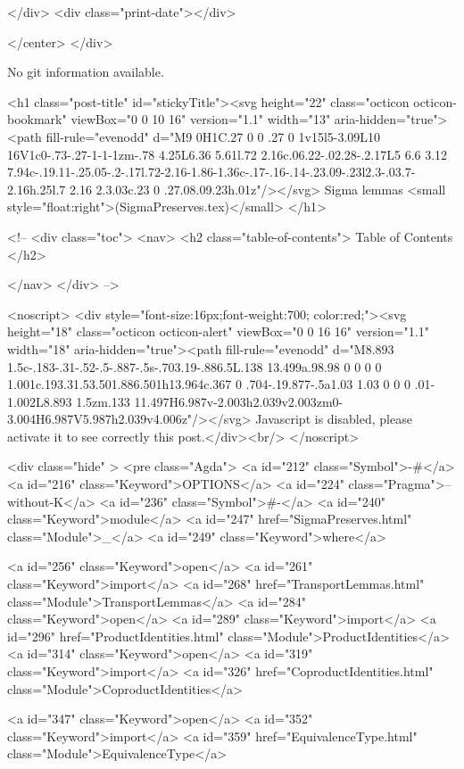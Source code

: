           
        </div>
        <div class="print-date"></div>
        
        
    </center>
  </div>

  
  No git information available.
  

  <h1 class="post-title" id="stickyTitle"><svg height="22" class="octicon octicon-bookmark" viewBox="0 0 10 16" version="1.1" width="13" aria-hidden="true"><path fill-rule="evenodd" d="M9 0H1C.27 0 0 .27 0 1v15l5-3.09L10 16V1c0-.73-.27-1-1-1zm-.78 4.25L6.36 5.61l.72 2.16c.06.22-.02.28-.2.17L5 6.6 3.12 7.94c-.19.11-.25.05-.2-.17l.72-2.16-1.86-1.36c-.17-.16-.14-.23.09-.23l2.3-.03.7-2.16h.25l.7 2.16 2.3.03c.23 0 .27.08.09.23h.01z"/></svg> Sigma lemmas <small style="float:right">(SigmaPreserves.tex)</small>
  </h1>

  <!-- 
  <div class="toc">
    <nav>
    <h2 class="table-of-contents"> Table of Contents </h2>
      

    </nav>
  </div>
   -->

  <noscript>
  <div style="font-size:16px;font-weight:700; color:red;"><svg height="18" class="octicon octicon-alert" viewBox="0 0 16 16" version="1.1" width="18" aria-hidden="true"><path fill-rule="evenodd" d="M8.893 1.5c-.183-.31-.52-.5-.887-.5s-.703.19-.886.5L.138 13.499a.98.98 0 0 0 0 1.001c.193.31.53.501.886.501h13.964c.367 0 .704-.19.877-.5a1.03 1.03 0 0 0 .01-1.002L8.893 1.5zm.133 11.497H6.987v-2.003h2.039v2.003zm0-3.004H6.987V5.987h2.039v4.006z"/></svg> Javascript is disabled, please activate it to see correctly this post.</div><br/>
  </noscript>

  <div class="hide" >
<pre class="Agda">
<a id="212" class="Symbol">{-#</a> <a id="216" class="Keyword">OPTIONS</a> <a id="224" class="Pragma">--without-K</a> <a id="236" class="Symbol">#-}</a>
<a id="240" class="Keyword">module</a> <a id="247" href="SigmaPreserves.html" class="Module">_</a> <a id="249" class="Keyword">where</a>

<a id="256" class="Keyword">open</a> <a id="261" class="Keyword">import</a> <a id="268" href="TransportLemmas.html" class="Module">TransportLemmas</a>
<a id="284" class="Keyword">open</a> <a id="289" class="Keyword">import</a> <a id="296" href="ProductIdentities.html" class="Module">ProductIdentities</a>
<a id="314" class="Keyword">open</a> <a id="319" class="Keyword">import</a> <a id="326" href="CoproductIdentities.html" class="Module">CoproductIdentities</a>

<a id="347" class="Keyword">open</a> <a id="352" class="Keyword">import</a> <a id="359" href="EquivalenceType.html" class="Module">EquivalenceType</a>

